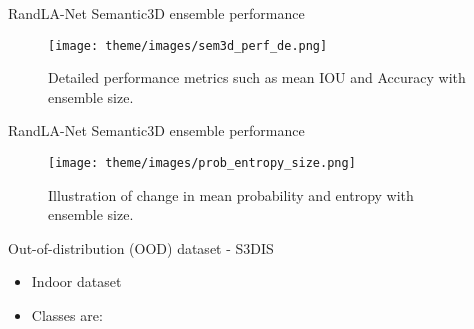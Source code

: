 \documentclass[aspectratio=169]{beamer}
\begin{document}
\begin{frame}{RandLA-Net Semantic3D ensemble performance}
    \begin{figure}
        \centering
        \texttt{[image: theme/images/sem3d\_perf\_de.png]}
        \caption{Detailed performance metrics such as mean IOU and Accuracy with ensemble size.}
    \end{figure}
\end{frame}
\begin{frame}{RandLA-Net Semantic3D ensemble performance}
    \begin{figure}
        \centering
        \texttt{[image: theme/images/prob\_entropy\_size.png]}
        \caption{Illustration of change in mean probability and entropy with ensemble size.}
    \end{figure}
\end{frame}
\begin{frame}{Out-of-distribution (OOD) dataset - S3DIS}
    \begin{itemize}
        \item Indoor dataset
        \item Classes are:
    \end{itemize}
    \begin{table}
        \caption{Classes in both the datasets, In-distribution (ID) dataset is Semantic3D and OOD dataset is S3DIS}

    \end{table}
\end{frame}
\end{document}

